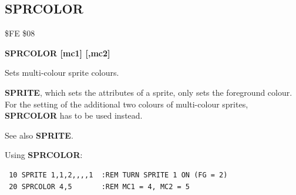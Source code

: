 
\newpage
\subsection{SPRCOLOR}
\begin{description}[leftmargin=2cm,style=nextline]
\item [Token:] \$FE \$08
\item [Format:] {\bf SPRCOLOR [mc1] [,mc2]}
\item [Usage:]  Sets multi-colour sprite colours.

                {\bf SPRITE}, which sets the
                attributes of a sprite, only sets the foreground
                colour. For the setting of the additional two colours
                of multi-colour sprites, {\bf SPRCOLOR} has
                to be used instead.

\item [Remarks:] See also {\bf SPRITE}.

\item [Example:] Using {\bf SPRCOLOR}:
\begin{tcolorbox}[colback=black,coltext=white]
\verbatimfont{\codefont}
\begin{verbatim}
 10 SPRITE 1,1,2,,,,1  :REM TURN SPRITE 1 ON (FG = 2)
 20 SPRCOLOR 4,5       :REM MC1 = 4, MC2 = 5
\end{verbatim}
\end{tcolorbox}
\end{description}


\newpage
